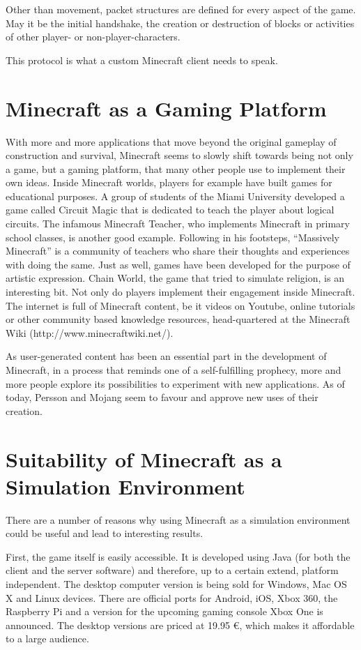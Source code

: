 Other than movement, packet structures are defined for every aspect of the game. May it be the initial handshake, the creation or destruction of blocks or activities of other player- or non-player-characters.

This protocol is what a custom Minecraft client needs to speak.

    \section{Minecraft as a Gaming Platform}
With more and more applications that move beyond the original gameplay of construction and survival, Minecraft seems to slowly shift towards being not only a game, but a gaming platform, that many other people use to implement their own ideas. Inside Minecraft worlds, players for example have built games for educational purposes. A group of students of the Miami University developed a game called Circuit Magic that is dedicated to teach the player about logical circuits. The infamous Minecraft Teacher, who implements Minecraft in primary school classes, is another good example. Following in his footsteps, ``Massively Minecraft'' is a community of teachers who share their thoughts and experiences with doing the same. Just as well, games have been developed for the purpose of artistic expression. Chain World, the game that tried to simulate religion, is an interesting bit. Not only do players implement their engagement inside Minecraft. The internet is full of Minecraft content, be it videos on Youtube, online tutorials or other community based knowledge resources, head-quartered at the Minecraft Wiki (http://www.minecraftwiki.net/).~\cite{Duncan:2011:MBC:2207096.2207097}

As user-generated content has been an essential part in the development of Minecraft, in a process that reminds one of a self-fulfilling prophecy, more and more people explore its possibilities to experiment with new applications. As of today, Persson and Mojang seem to favour and approve new uses of their creation.~\cite{Duncan:2011:MBC:2207096.2207097}

    \section{Suitability of Minecraft as a Simulation Environment}
There are a number of reasons why using Minecraft as a simulation environment could be useful and lead to interesting results.

First, the game itself is easily accessible. It is developed using Java (for both the client and the server software) and therefore, up to a certain extend, platform independent. The desktop computer version is being sold for Windows, Mac OS X and Linux devices. There are official ports for Android, iOS, Xbox 360, the Raspberry Pi and a version for the upcoming gaming console Xbox One is announced. The desktop versions are priced at 19.95 \euro, which makes it affordable to a large audience.

